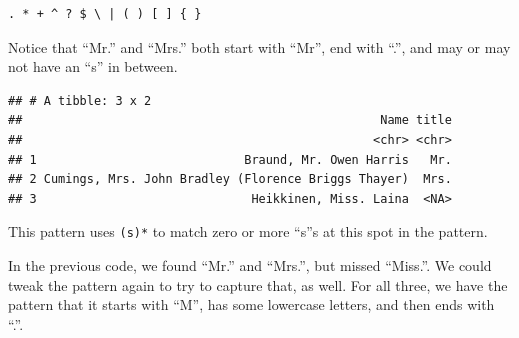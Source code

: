 \documentclass[]{book}
\makeatletter
\newenvironment{Shaded}{\begin{snugshade}}{\end{snugshade}}
\newcommand{\KeywordTok}[1]{\textcolor[rgb]{0.13,0.29,0.53}{\textbf{#1}}}
\newcommand{\DataTypeTok}[1]{\textcolor[rgb]{0.13,0.29,0.53}{#1}}
\newcommand{\DecValTok}[1]{\textcolor[rgb]{0.00,0.00,0.81}{#1}}
\newcommand{\CharTok}[1]{\textcolor[rgb]{0.31,0.60,0.02}{#1}}
\newcommand{\StringTok}[1]{\textcolor[rgb]{0.31,0.60,0.02}{#1}}
\newcommand{\OperatorTok}[1]{\textcolor[rgb]{0.81,0.36,0.00}{\textbf{#1}}}
\newcommand{\NormalTok}[1]{#1}
\newenvironment{kframe}{%
\medskip{}
\setlength{\fboxsep}{.8em}
 \def\at@end@of@kframe{}%
 \ifinner\ifhmode%
  \def\at@end@of@kframe{\end{minipage}}%
  \begin{minipage}{\columnwidth}%
 \fi\fi%
 \def\FrameCommand##1{\hskip\@totalleftmargin \hskip-\fboxsep
 \colorbox{shadecolor}{##1}\hskip-\fboxsep
     \hskip-\linewidth \hskip-\@totalleftmargin \hskip\columnwidth}%
 \MakeFramed {\advance\hsize-\width
   \@totalleftmargin\z@ \linewidth\hsize
   \@setminipage}}%
 {\par\unskip\endMakeFramed%
 \at@end@of@kframe}
\renewenvironment{Shaded}{\begin{kframe}}{\end{kframe}}
\theoremstyle{definition}
\theoremstyle{definition}
\theoremstyle{definition}
\theoremstyle{remark}
\makeatother
\begin{document}
\begin{verbatim}
. * + ^ ? $ \ | ( ) [ ] { }
\end{verbatim}

Notice that ``Mr.'' and ``Mrs.'' both start with ``Mr'', end with ``.'',
and may or may not have an ``s'' in between.

\begin{Shaded}
\end{Shaded}

\begin{verbatim}
## # A tibble: 3 x 2
##                                                  Name title
##                                                 <chr> <chr>
## 1                             Braund, Mr. Owen Harris   Mr.
## 2 Cumings, Mrs. John Bradley (Florence Briggs Thayer)  Mrs.
## 3                              Heikkinen, Miss. Laina  <NA>
\end{verbatim}

This pattern uses \texttt{(s)*} to match zero or more ``s''s at this
spot in the pattern.

In the previous code, we found ``Mr.'' and ``Mrs.'', but missed
``Miss.''. We could tweak the pattern again to try to capture that, as
well. For all three, we have the pattern that it starts with ``M'', has
some lowercase letters, and then ends with ``.''.

\begin{Shaded}
\end{Shaded}
\end{document}
